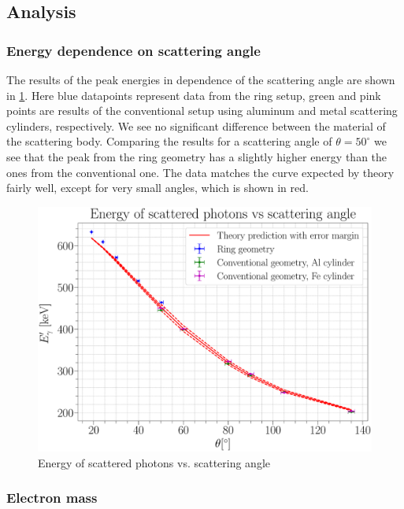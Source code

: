 \documentclass[a4paper,12pt]{article}
\begin{document}
\subsection{Analysis}

\subsubsection{Energy dependence on scattering angle}

The results of the peak energies in dependence of the scattering angle are shown in \cref{Ephi}. Here blue datapoints represent data from the ring setup, green and pink points are results of the conventional setup using aluminum and metal scattering cylinders, respectively. We see no significant difference between the material of the scattering body. Comparing the results for a scattering angle of $\theta = 50 ^\circ$ we see that the peak from the ring geometry has a slightly higher energy than the ones from the conventional one. The data matches the curve expected by theory fairly well, except for very small angles, which is shown in red.

\begin{figure}[H]
\centering
\includegraphics[scale=0.25]{../Figures/E_Phi.eps}
\caption{Energy of scattered photons vs. scattering angle}
\label{Ephi}
\end{figure}

\subsubsection{Electron mass}
\end{document}
